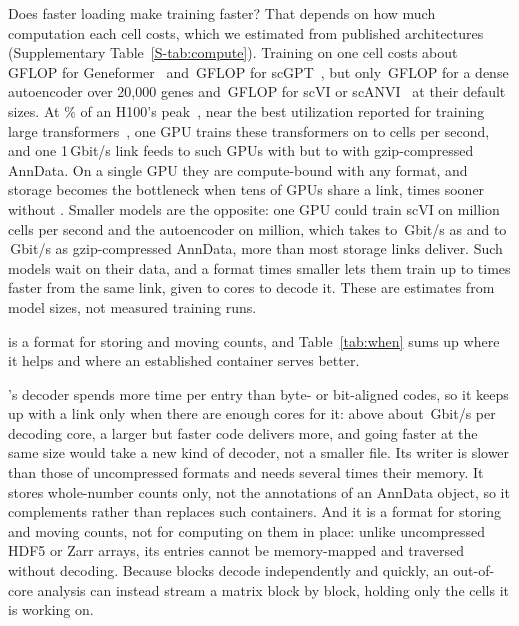 Does faster loading make training faster? That depends on how much computation each cell costs, which we estimated from
published architectures (Supplementary Table~\ref{S-tab:compute}). Training on one cell costs about
\,GFLOP for Geneformer~\cite{theodoris2023transfer} and \,GFLOP for
scGPT~\cite{cui2024scgpt}, but only \,GFLOP for a dense autoencoder over 20,000 genes and
\,GFLOP for scVI or scANVI~\cite{lopez2018deep,xu2021scanvi} at their default sizes. At
\% of an H100's peak~\cite{nvidia2022h100}, near the best utilization reported for training large
transformers~\cite{chowdhery2023palm}, one GPU trains these transformers on  to
 cells per second, and one 1\,Gbit/s link feeds  to
 such GPUs with \sone{} but  to  with
gzip-compressed AnnData. On a single GPU they are compute-bound with any format, and storage becomes the bottleneck when
tens of GPUs share a link,  times sooner without \sone. Smaller models are the opposite: one GPU could train
scVI on  million cells per second and the autoencoder on  million, which takes
 to \,Gbit/s as \sone{} and  to
\,Gbit/s as gzip-compressed AnnData, more than most storage links deliver. Such models wait on their
data, and a format  times smaller lets them train up to  times faster from the same link, given
 to  cores to decode it. These are estimates from model sizes, not measured training
runs.


\sone{} is a format for storing and moving counts, and Table~\ref{tab:when} sums up where it helps and where an
established container serves better.

\sone's decoder spends more time per entry than byte- or bit-aligned codes, so it keeps up with
a link only when there are enough cores for it: above about \,Gbit/s per decoding core, a larger but
faster code delivers more, and going faster at the same size would take a new kind of decoder, not a smaller file. Its
writer is slower than those of uncompressed formats and needs several times their memory. It stores whole-number counts
only, not the annotations of an AnnData object, so it complements rather than replaces such containers. And it is a format
for storing and moving counts, not for computing on them in place: unlike uncompressed HDF5 or Zarr arrays, its entries
cannot be memory-mapped and traversed without decoding. Because blocks decode independently and quickly, an out-of-core
analysis can instead stream a matrix block by block, holding only the cells it is working on.

